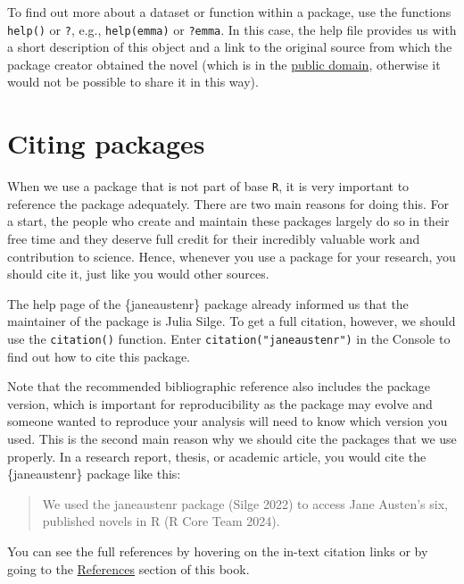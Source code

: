 \documentclass[
  letterpaper,
  DIV=11,
  numbers=noendperiod,
  oneside]{scrreprt}
\begin{document}
To find out more about a dataset or function within a package, use the
functions \texttt{help()} or \texttt{?}, e.g., \texttt{help(emma)} or
\texttt{?emma}. In this case, the help file provides us with a short
description of this object and a link to the original source from which
the package creator obtained the novel (which is in the
\href{https://www.gutenberg.org/help/faq.html\#what-books-does-project-gutenberg-publish}{public
domain}, otherwise it would not be possible to share it in this way).

\section{Citing packages}\label{citing-packages}

When we use a package that is not part of base \texttt{R}, it is very
important to reference the package adequately. There are two main
reasons for doing this. For a start, the people who create and maintain
these packages largely do so in their free time and they deserve full
credit for their incredibly valuable work and contribution to science.
Hence, whenever you use a package for your research, you should cite it,
just like you would other sources.

The help page of the \{janeaustenr\} package already informed us that
the maintainer of the package is Julia Silge. To get a full citation,
however, we should use the \texttt{citation()} function. Enter
\texttt{citation("janeaustenr")} in the Console to find out how to cite
this package.

Note that the recommended bibliographic reference also includes the
package version, which is important for reproducibility as the package
may evolve and someone wanted to reproduce your analysis will need to
know which version you used. This is the second main reason why we
should cite the packages that we use properly. In a research report,
thesis, or academic article, you would cite the \{janeaustenr\} package
like this:

\begin{quote}
We used the janeaustenr package (Silge 2022) to access Jane Austen's
six, published novels in R (R Core Team 2024).
\end{quote}

You can see the full references by hovering on the in-text citation
links or by going to the
\href{https://elenlefoll.github.io/RstatsTextbook/references.html}{References}
section of this book.

\end{document}
